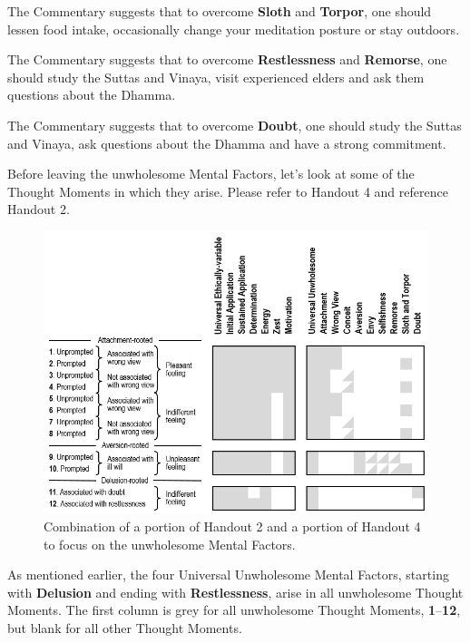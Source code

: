 The Commentary suggests that to overcome \textbf{Sloth} and \textbf{Torpor}, one should lessen food intake, occasionally change your meditation posture or stay outdoors.

The Commentary suggests that to overcome \textbf{Restlessness} and \textbf{Remorse}, one should study the Suttas and Vinaya, visit experienced elders and ask them questions about the Dhamma.

The Commentary suggests that to overcome \textbf{Doubt}, one should study the Suttas and Vinaya, ask questions about the Dhamma and have a strong commitment.

Before leaving the unwholesome Mental Factors, let’s look at some of the Thought Moments in which they arise. Please refer to Handout 4 and reference Handout 2.

\begin{figure}[h]
\centering
\includegraphics[width=1\linewidth]{./Diagrams/Unwholesome}
\caption{Combination of a portion of Handout 2 and a portion of Handout 4 to focus on the unwholesome Mental Factors.}
\label{fig:Unwholesome}
\end{figure}

As mentioned earlier, the four Universal Unwholesome Mental Factors, starting with \textbf{Delusion} and ending with \textbf{Restlessness}, arise in all unwholesome Thought Moments. The first column is grey for all unwholesome Thought Moments, \textbf{1}--\textbf{12}, but blank for all other Thought Moments.

